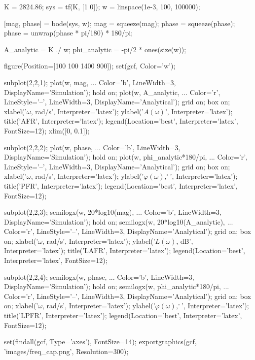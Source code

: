\begin{matlabcode}
K = 2824.86;
sys = tf(K, [1 0]);
w = linspace(1e-3, 100, 100000);

[mag, phase] = bode(sys, w);
mag = squeeze(mag); phase = squeeze(phase);
phase = unwrap(phase * pi/180) * 180/pi;

A_analytic = K ./ w;
phi_analytic = -pi/2 * ones(size(w));

figure(Position=[100 100 1400 900]);
set(gcf, Color='w');

subplot(2,2,1);
plot(w, mag, ...
    Color='b', LineWidth=3, DisplayName='Simulation');
hold on;
plot(w, A_analytic, ...
    Color='r', LineStyle='--', LineWidth=3, DisplayName='Analytical');
grid on; box on;
xlabel('$\omega$, rad/s', Interpreter='latex');
ylabel('$A(\omega)$', Interpreter='latex');
title('AFR', Interpreter='latex');
legend(Location='best', Interpreter='latex', FontSize=12);
xlim([0, 0.1]);

subplot(2,2,2);
plot(w, phase, ...
    Color='b', LineWidth=3, DisplayName='Simulation');
hold on;
plot(w, phi_analytic*180/pi, ...
    Color='r', LineStyle='--', LineWidth=3, DisplayName='Analytical');
grid on; box on;
xlabel('$\omega$, rad/s', Interpreter='latex');
ylabel('$\varphi(\omega), ^\circ$', Interpreter='latex');
title('PFR', Interpreter='latex');
legend(Location='best', Interpreter='latex', FontSize=12);

subplot(2,2,3);
semilogx(w, 20*log10(mag), ...
    Color='b', LineWidth=3, DisplayName='Simulation');
hold on;
semilogx(w, 20*log10(A_analytic), ...
    Color='r', LineStyle='--', LineWidth=3, DisplayName='Analytical');
grid on; box on;
xlabel('$\omega$, rad/s', Interpreter='latex');
ylabel('$L(\omega)$, dB', Interpreter='latex');
title('LAFR', Interpreter='latex');
legend(Location='best', Interpreter='latex', FontSize=12);

subplot(2,2,4);
semilogx(w, phase, ...
    Color='b', LineWidth=3, DisplayName='Simulation');
hold on;
semilogx(w, phi_analytic*180/pi, ...
    Color='r', LineStyle='--', LineWidth=3, DisplayName='Analytical');
grid on; box on;
xlabel('$\omega$, rad/s', Interpreter='latex');
ylabel('$\varphi(\omega), ^\circ$', Interpreter='latex');
title('LPFR', Interpreter='latex');
legend(Location='best', Interpreter='latex', FontSize=12);

set(findall(gcf, Type='axes'), FontSize=14);
exportgraphics(gcf, 'images/freq_cap.png', Resolution=300);
\end{matlabcode}



